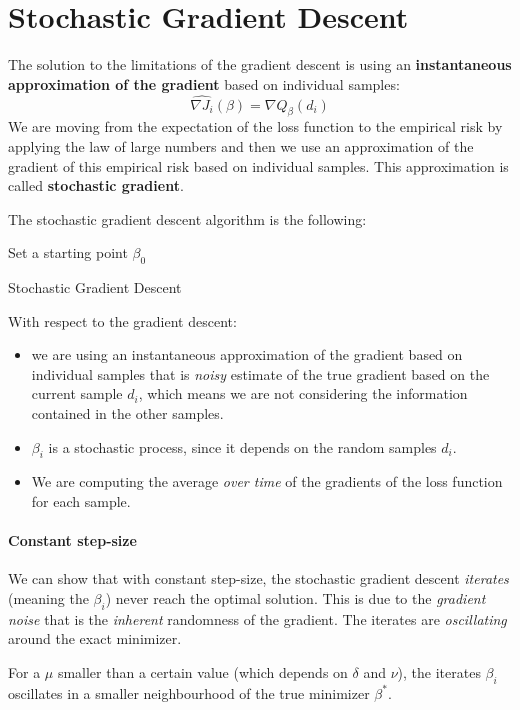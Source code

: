 \section{Stochastic Gradient Descent}
The solution to the limitations of the gradient descent is using an \textbf{instantaneous approximation of the gradient} based on individual samples:
\[
    \hat{\nabla J_i}(\beta) = \nabla Q_\beta(d_i)
\]
We are moving from the expectation of the loss function to the empirical risk by applying the law of large numbers and then we use an approximation of the gradient of this empirical risk based on individual samples. This approximation is called \textbf{stochastic gradient}.

The stochastic gradient descent algorithm is the following:

\begin{algorithm}[H]
    \SetAlgoLined
    Set a starting point $\beta_0$ \\
    \caption{Stochastic Gradient Descent}
\end{algorithm}

With respect to the gradient descent:
\begin{itemize}
    \item we are using an instantaneous approximation of the gradient based on individual samples that is \textit{noisy} estimate of the true gradient based on the current sample $d_i$, which means we are not considering the information contained in the other samples.
    \item $\beta_i$ is a stochastic process, since it depends on the random samples $d_i$.
    \item We are computing the average \textit{over time} of the gradients of the loss function for each sample.
\end{itemize}
\paragraph*{Constant step-size}
We can show that with constant step-size, the stochastic gradient descent \textit{iterates} (meaning the $\beta_i$) never reach the optimal solution. This is due to the \textit{gradient noise} that is the \textit{inherent} randomness of the gradient. The iterates are \textit{oscillating} around the exact minimizer.


For a $\mu$ smaller than a certain value (which depends on $\delta$ and $\nu$), the iterates $\beta_i$ oscillates in a smaller neighbourhood of the true minimizer $\beta^\ast$.

